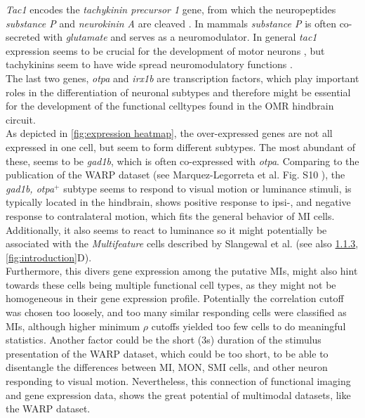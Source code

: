\documentclass[12pt, a4paper, oneside]{article}
\begin{document}
\textit{Tac1} encodes the \textit{tachykinin precursor 1} gene, from which the neuropeptides \textit{substance P} and \textit{neurokinin A} are cleaved \parencite{ogawaCloningExpressionTachykinins2012}.
In mammals \textit{substance P} is often co-secreted with \textit{glutamate} \parencite{caoPrimaryAfferentTachykinins1998} and serves as a neuromodulator. In general \textit{tac1} expression seems to be crucial for the development of motor neurons \parencite{ushakovaTachykininNeuropeptidesAre2026}, but tachykinins seem to have wide spread neuromodulatory functions \parencite{nasselTachykininsNeuropeptidesThat2019}.\\
The last two genes, \textit{otpa} and \textit{irx1b} are transcription factors, which play important roles in the differentiation of neuronal subtypes \parencite{fernandesOrthopediaTranscriptionFactor2013, stedmanFunctionalInteractionIrx2009} and therefore might be essential for the development of the functional celltypes found in the OMR hindbrain circuit.\\

As depicted in \autoref{fig:expression heatmap}, the over-expressed genes are not all expressed in one cell, but seem to form different subtypes. The most abundant of these, seems to be \textit{gad1b}, which is often co-expressed with \textit{otpa}. Comparing to the publication of the WARP dataset (see Marquez-Legorreta et al. Fig. S10 \parencite{marquez-legorretaWholeBrainCoMappingGene2026}), the \textit{gad1b, otpa}$^+$ subtype seems to respond to visual motion or luminance stimuli, is typically located in the hindbrain, shows positive response to ipsi-, and negative response to contralateral motion, which fits the general behavior of MI cells. Additionally, it also seems to react to luminance so it might potentially be associated with the \textit{Multifeature} cells described by Slangewal et al. \parencite{slangewalVisuomotorDecisionmakingMultifeature2026} (see also \hyperref[sec:phototaxis]{1.1.3}, \autoref{fig:introduction}D).\\

Furthermore, this divers gene expression among the putative MIs, might also hint towards these cells being multiple functional cell types, as they might not be homogeneous in their gene expression profile. Potentially the correlation cutoff was chosen too loosely, and too many similar responding cells were classified as MIs, although higher minimum $\rho$ cutoffs yielded too few cells to do meaningful statistics. Another factor could be the short (3s) duration of the stimulus presentation of the WARP dataset, which could be too short, to be able to disentangle the differences between MI, MON, SMI cells, and other neuron responding to visual motion. Nevertheless, this connection of functional imaging and gene expression data, shows the great potential of multimodal datasets, like the WARP dataset.\\
\end{document}
